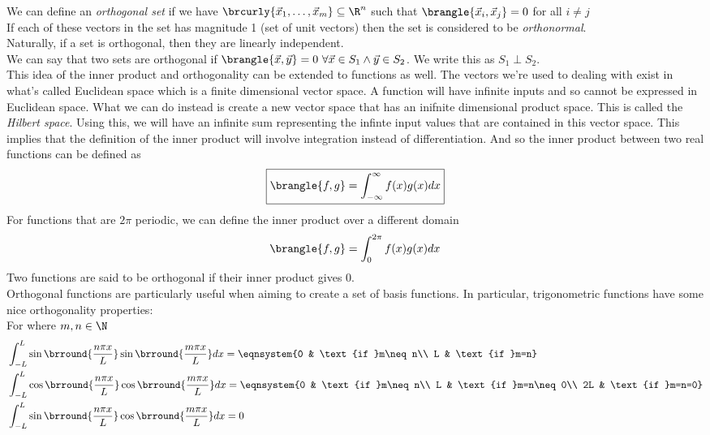 We can define an \textit{orthogonal set} if we have $\brcurly{\vec{x}_1,\ldots,\vec{x}_m}\subseteq\R^n$ such that $\brangle{\vec{x}_i,\vec{x}_j}=0$ for all $i\neq j$\\
If each of these vectors in the set has magnitude 1 (set of unit vectors) then the set is considered to be \textit{orthonormal}.\\
Naturally, if a set is orthogonal, then they are linearly independent.\\
We can say that two sets are orthogonal if $\brangle{\vec{x},\vec{y}}=0\ \forall\vec{x}\in S_1\wedge\vec{y}\in S_2$. We write this as $S_1\perp S_2$.\\

This idea of the inner product and orthogonality can be extended to functions as well. The vectors we're used to dealing with exist in what's called Euclidean space which is a finite dimensional vector space.
A function will have infinite inputs and so cannot be expressed in Euclidean space. What we can do instead is create a new vector space that has an inifnite dimensional product space. This is called the \textit{Hilbert space}.
Using this, we will have an infinite sum representing the infinte input values that are contained in this vector space. This implies that the definition of the inner product will involve integration instead of differentiation.
And so the inner product between two real functions can be defined as
$$\boxed{\brangle{f,g}=\int_{-\infty}^\infty f(x)g(x)dx}$$
For functions that are $2\pi$ periodic, we can define the inner product over a different domain
$$\brangle{f,g}=\int_0^{2\pi}f(x)g(x)dx$$
Two functions are said to be orthogonal if their inner product gives 0.\\
Orthogonal functions are particularly useful when aiming to create a set of basis functions. In particular, trigonometric functions have some nice orthogonality properties:\\
For where $m,n\in\N$
\begin{align*}
    &\int_{-L}^L\sin\brround{\frac{n\pi x}{L}}\sin\brround{\frac{m\pi x}{L}}dx=\eqnsystem{0 & \text{if }m\neq n\\ L & \text{if }m=n}\\
    &\int_{-L}^L\cos\brround{\frac{n\pi x}{L}}\cos\brround{\frac{m\pi x}{L}}dx=\eqnsystem{0 & \text{if }m\neq n\\ L & \text{if }m=n\neq 0\\ 2L & \text{if }m=n=0}\\
    &\int_{-L}^L\sin\brround{\frac{n\pi x}{L}}\cos\brround{\frac{m\pi x}{L}}dx=0
\end{align*}


